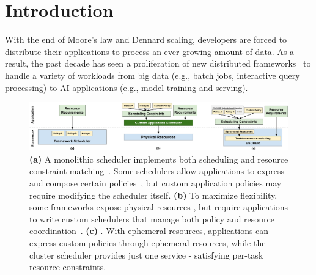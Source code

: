\section{Introduction}
\label{sec:intro}

With the end of Moore’s law and Dennard scaling, developers are forced to distribute their applications to process an ever growing amount of data. As a result, the past decade has seen a proliferation of new distributed frameworks~\cite{kubernetes, ray-osdi, mesos} to handle a variety of workloads from big data (e.g., batch jobs, interactive query processing) to AI applications (e.g., model training and serving).


\begin{figure}[ht]
\centering
\includegraphics[width=0.92\linewidth]{escher/figures/escher-compare-arch.pdf}
\caption{\small
\textbf{(a)} A monolithic scheduler implements both scheduling and resource constraint matching~\cite{ghodsi2011dominant,isardquincy,mpi,kubernetes}. Some schedulers allow applications to express and compose certain policies~\cite{condor,tetrisched,kubernetes}, but custom application policies may require modifying the scheduler itself.
\textbf{(b)} To maximize flexibility, some frameworks expose physical resources \cite{mesos, omega}, but require applications to write custom schedulers that manage both policy and resource coordination~\cite{gandiva,DevinMasters,mapreduce}.
\textbf{(c)} \name{}. With ephemeral resources, applications can express custom policies through ephemeral resources, while the cluster scheduler provides just one service - satisfying per-task resource constraints.
}
\label{fig:scheduler-architectures-new}
\vspace{-2mm}
\end{figure}

